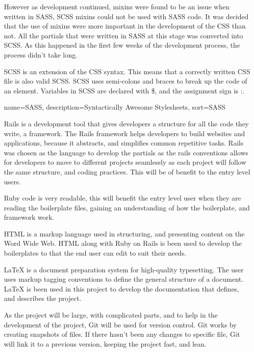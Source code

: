 However as development continued, mixins were found to be an issue when written in \gls{SASS}, \gls{SCSS} mixins could not be used with \gls{SASS} code. It was decided that the use of mixins were more important in the development of the \gls{CSS} than not. All the partials that were written in \gls{SASS} at this stage was converted into \gls{SCSS}. As this happened in the first few weeks of the development process, the process didn't take long. 

\gls{SCSS} is an extension of the \gls{CSS} syntax. This means that a correctly written \gls{CSS} file is also valid \gls{SCSS}. \gls{SCSS} uses semi-colons and braces to break up the code of an element. Variables in \gls{SCSS} are declared with \$, and the assignment sign is :. 

%
{
  name={SASS},
  description={Syntactically Awesome Stylesheets},
  sort=SASS
}
%

Rails is a development tool that gives developers a structure for all the code they write, a framework. The Rails framework helps developers to build websites and applications, because it abstracts, and simplifies common repetitive tasks. Rails was chosen as the language to develop the partials as the rails conventions allows for developers to move to different projects seamlessly as each project will follow the same structure, and coding practices. This will be of benefit to the entry level users. 

Ruby code is very readable, this will benefit the entry level user when they are reading the boilerplate files, gaining an understanding of how the boilerplate, and framework work. 

HTML is a markup language used in structuring, and presenting content on the Word Wide Web. HTML along with Ruby on Rails is been used to develop the boilerplates to that the end user can edit to suit their needs. 

LaTeX is a document preparation system for high-quality typesetting. The user uses markup tagging conventions to define the general structure of a document. LaTeX is been used in this project to develop the documentation that defines, and describes the project.

As the project will be large, with complicated parts, and to help in the development of the project, Git will be used for version control. Git works by creating snapshots of files. If there hasn't been any changes to specific file, Git will link it to a previous version, keeping the project fast, and lean. 

